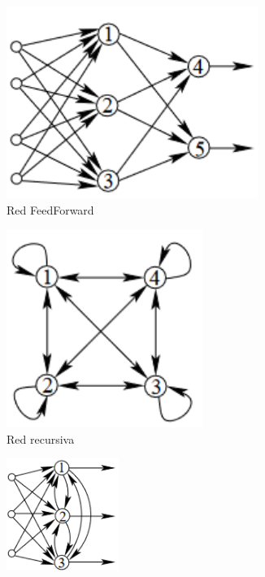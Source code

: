 \begin{figure}[H]
    \centering
    \begin{subfigure}[b]{0.25\textwidth}
        \centering
        \includegraphics[width=0.9\textwidth]{images/4/FeedForward.png}
        \caption{Red FeedForward}
        \label{fig:a}
    \end{subfigure}
    \begin{subfigure}[b]{0.25\textwidth}
        \centering
        \includegraphics[width=0.7\textwidth]{images/4/Recursiva.png}
        \caption{Red recursiva}
        \label{fig:b}
    \end{subfigure}
    \begin{subfigure}[b]{0.45\textwidth}
        \centering
        \includegraphics[width=0.4\textwidth]{images/4/FeedForwardLateral.png}

\end{subfigure}
\end{figure}
